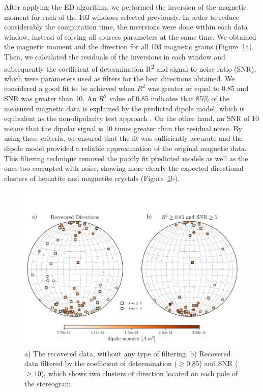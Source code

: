 After applying the ED algorithm, we performed the inversion of the magnetic moment for each of the 103 windows selected previously. In order to reduce considerably the computation time, the inversions were done within each data window, instead of solving all sources parameters at the same time. We obtained the magnetic moment and the direction for all 103 magnetic grains (Figure~\ref{real-data-stereograms}a). Then, we calculated the residuals of the inversions in each window and subsequently the coefficient of determination R\textsuperscript{2} and signal-to-noise ratio (SNR), which were parameters used as filters for the best directions obtained. We considered a good fit to be achieved when $R^2$ was greater or equal to 0.85 and SNR was greater than 10. An $R^2$ value of 0.85 indicates that 85\% of the measured magnetic data is explained by the predicted dipole model, which is equivalent as the non-dipolarity test approach \citep{Fu2020}. On the other hand, an SNR of 10 means that the dipolar signal is 10 times greater than the residual noise. By using these criteria, we ensured that the fit was sufficiently accurate and the dipole model provided a reliable approximation of the original magnetic data. This filtering technique removed the poorly fit predicted models as well as the ones too corrupted with noise, showing more clearly the expected directional clusters of hematite and magnetite crystals (Figure~\ref{real-data-stereograms}b).


\begin{figure}[tb]
\centering
\includegraphics[width=1\linewidth]{figures/real-data-stereograms.png}
\caption{
a) The recovered data, without any type of filtering. b) Recovered data
filtered by the coefficient of determination ($\geq 0.85$) and SNR ($\geq 10$), which shows
two clusters of direction located on each pole of the stereogram.
}
\label{real-data-stereograms}
\end{figure}

